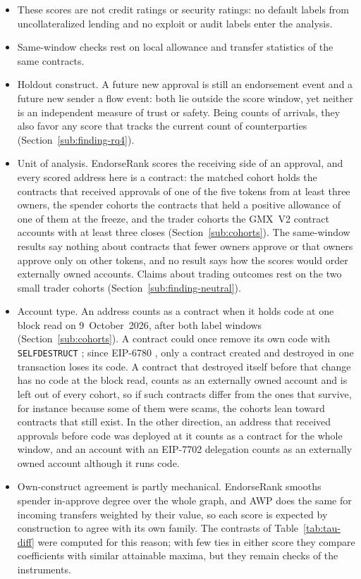 \begin{itemize}
\item These scores are not credit ratings or security ratings: no default labels from uncollateralized lending and no exploit or audit labels enter the analysis.
\item Same-window checks rest on local allowance and transfer statistics of the same contracts.
\item Holdout construct. A future new approval is still an endorsement event and a future new sender a flow event: both lie outside the score window, yet neither is an independent measure of trust or safety. Being counts of arrivals, they also favor any score that tracks the current count of counterparties (Section~\ref{sub:finding-rq4}).
\item Unit of analysis. EndorseRank scores the receiving side of an approval, and every scored address here is a contract: the matched cohort holds the contracts that received approvals of one of the five tokens from at least three owners, the spender cohorts the contracts that held a positive allowance of one of them at the freeze, and the trader cohorts the GMX~V2 contract accounts with at least three closes (Section~\ref{sub:cohorts}). The same-window results say nothing about contracts that fewer owners approve or that owners approve only on other tokens, and no result says how the scores would order externally owned accounts. Claims about trading outcomes rest on the two small trader cohorts (Section~\ref{sub:finding-neutral}).
\item Account type. An address counts as a contract when it holds code at one block read on 9~October~2026, after both label windows (Section~\ref{sub:cohorts}). A contract could once remove its own code with \texttt{SELFDESTRUCT} \parencite{wood2025yellowpaper}; since EIP-6780 \parencite{ballet2023eip6780}, only a contract created and destroyed in one transaction loses its code. A contract that destroyed itself before that change has no code at the block read, counts as an externally owned account and is left out of every cohort, so if such contracts differ from the ones that survive, for instance because some of them were scams, the cohorts lean toward contracts that still exist. In the other direction, an address that received approvals before code was deployed at it counts as a contract for the whole window, and an account with an EIP-7702 delegation \parencite{buterin2024eip7702} counts as an externally owned account although it runs code.
\item Own-construct agreement is partly mechanical. EndorseRank smooths spender in-approve degree over the whole graph, and AWP does the same for incoming transfers weighted by their value, so each score is expected by construction to agree with its own family. The contrasts of Table~\ref{tab:tau-diff} were computed for this reason; with few ties in either score they compare coefficients with similar attainable maxima, but they remain checks of the instruments.

\end{itemize}
